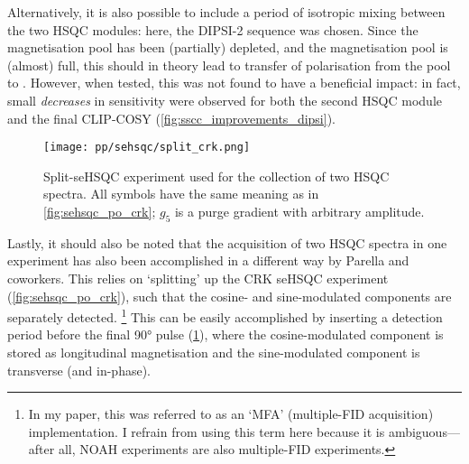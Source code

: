 Alternatively, it is also possible to include a period of isotropic mixing between the two HSQC modules: here, the DIPSI-2 sequence\autocite{Shaka1988JMR} was chosen.
Since the  magnetisation pool has been (partially) depleted, and the  magnetisation pool is (almost) full, this should in theory lead to transfer of polarisation from the  pool to .
However, when tested, this was not found to have a beneficial impact: in fact, small \textit{decreases} in sensitivity were observed for both the second HSQC module and the final CLIP-COSY (\cref{fig:sscc_improvements_dipsi}).

\begin{figure}[!ht]
    \centering
    \texttt{[image: pp/sehsqc/split\_crk.png]}%
    \caption[Split-seHSQC experiment]{
        Split-seHSQC experiment used for the collection of two HSQC spectra.\autocite{Nolis2019CPC}
        All symbols have the same meaning as in \cref{fig:sehsqc_po_crk}; $g_5$ is a purge gradient with arbitrary amplitude.
    }
    \label{fig:split_crk}
\end{figure}

Lastly, it should also be noted that the acquisition of two HSQC spectra in one experiment has also been accomplished in a different way by Parella and coworkers\autocite{Nolis2019CPC,Nolis2019JMR}.
This relies on `splitting' up the CRK seHSQC experiment (\cref{fig:sehsqc_po_crk}), such that the cosine- and sine-modulated components are separately detected.%
\footnote{In my paper\autocite{Yong2021JMR}, this was referred to as an `MFA' (multiple-FID acquisition) implementation. I refrain from using this term here because it is ambiguous---after all, NOAH experiments are also multiple-FID experiments.}
This can be easily accomplished by inserting a detection period before the final \proton{} \ang{90} pulse (\cref{fig:split_crk}), where the cosine-modulated component is stored as longitudinal magnetisation and the sine-modulated component is transverse (and in-phase).

